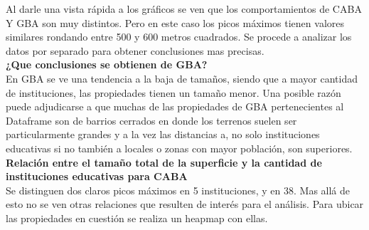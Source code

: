 \documentclass[a4paper, 10pt]{article}
\begin{document}
				Al darle una vista rápida a los gráficos se  ven que los comportamientos de 
				CABA Y GBA son muy distintos. Pero en este caso los picos máximos tienen 
				valores similares rondando entre 500 y 600 metros cuadrados. 
				Se procede a analizar los datos por separado para obtener conclusiones mas precisas.\\
				
				\textbf{¿Que conclusiones se obtienen de GBA?}\\
				En GBA se ve una tendencia a la baja de tamaños, siendo que a mayor 
				cantidad de instituciones, las propiedades tienen un tamaño menor. 
				Una posible razón puede adjudicarse a que muchas de las propiedades 
				de GBA pertenecientes al Dataframe son de barrios cerrados en donde 
				los terrenos suelen ser particularmente grandes y a la vez las 
				distancias a, no solo instituciones educativas si no también a 
				locales o zonas con mayor población, son superiores.\\
				
				\textbf{Relación entre el tamaño total de la superficie y la cantidad de 
				instituciones educativas para CABA}\\
				Se distinguen dos claros picos máximos en 5 instituciones, y en 38. 
				Mas allá de esto no se ven otras relaciones que resulten de interés 
				para el análisis. Para ubicar las propiedades en cuestión se realiza 
				un heapmap con ellas.
					
\end{document}
